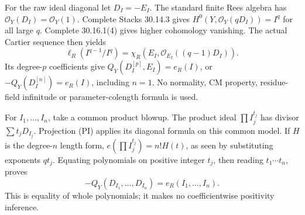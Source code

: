 For the raw ideal diagonal let \(D_I=-E_I\). The standard finite Rees algebra has \(\mathcal O_Y(D_I)=\mathcal O_Y(1)\). Complete Stacks 30.14.3 gives \(H^0(Y,\mathcal O_Y(qD_I))=I^q\) for all large \(q\). Complete 30.16.1(4) gives higher cohomology vanishing. The actual Cartier sequence then yields
\[
\ell_R(I^{q-1}/I^q)=\chi_R(E_I,\mathcal O_{E_I}((q-1)D_I)).
\]
Its degree-\(p\) coefficients give \(Q_Y(D_I^{[p]},E_I)=e_R(I)\), or \(-Q_Y(D_I^{[n]})=e_R(I)\), including \(n=1\). No normality, CM property, residue-field infinitude or parameter-colength formula is used.

For \(I_1,\ldots,I_n\), take a common product blowup. The product ideal \(\prod I_j^{t_j}\) has divisor \(\sum t_jD_{I_j}\). Projection (PI) applies its diagonal formula on this common model. If \(H\) is the degree-\(n\) length form, \(e(\prod I_j^{t_j})=n!H(t)\), as seen by substituting exponents \(q t_j\). Equating polynomials on positive integer \(t_j\), then reading \(t_1\cdots t_n\), proves
\[
-Q_Y(D_{I_1},\ldots,D_{I_n})=e_R(I_1,\ldots,I_n). \tag{I}
\]
This is equality of whole polynomials; it makes no coefficientwise positivity inference.
